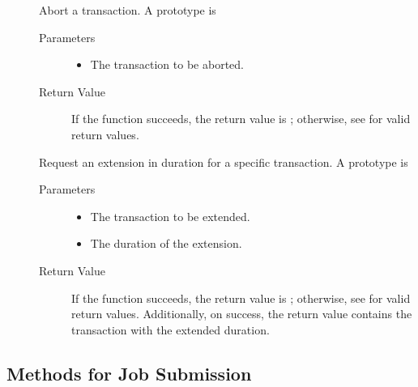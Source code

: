 \begin{description}
\item []
  Abort a transaction.
  A prototype is


  \begin{description}
    \item[ Parameters]
    \begin{itemize}
      \item {} The transaction to be aborted.
    \end{itemize}
    \item[ Return Value]
      If the function succeeds, the return value is ; 
      otherwise, see  for valid return values. 
  \end{description}  
  
\item []
  Request an extension in duration for a specific transaction.
  A prototype is


  \begin{description}
    \item[ Parameters]
    \begin{itemize}
      \item {} The transaction to be extended.
      \item {} The duration of the extension.
    \end{itemize}
    \item[ Return Value]
      If the function succeeds, the return value is ; 
      otherwise, see  for valid return values. Additionally,
      on success, the return value contains the transaction with the extended
      duration.
  \end{description}  
  
\end{description}

\subsection{\label{WebService-Methods-Submission} Methods for Job Submission}

